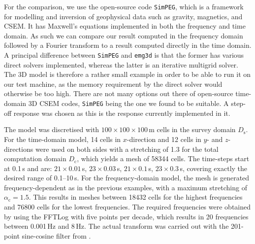 \documentclass[extra, camera,%
]{gji}
\newcommand{\mr}[1]{\mathrm{#1}}
\newcommand{\emg}[2]{\texttt{emg#1#2}\xspace}
\newcommand{\simpeg}{\texttt{SimPEG}\xspace}
\begin{document}
For the comparison, we use the open-source code \simpeg \citep{CAG.15.Cockett},
which is a framework for modelling and inversion of geophysical data such as
gravity, magnetics, and CSEM. It has Maxwell's equations implemented in both
the frequency and time domain. As such we can compare our result computed in
the frequency domain followed by a Fourier transform to a result computed
directly in the time domain. A principal difference between \simpeg and \emg3d
is that the former has various direct solvers implemented, whereas the latter
is an iterative multigrid solver. The 3D model is therefore a rather small
example in order to be able to run it on our test machine, as the memory
requirement by the direct solver would otherwise be too high. There are not
many options out there of open-source time-domain 3D CSEM codes, \simpeg being
the one we found to be suitable. A step-off response was chosen as this is the
response currently implemented in it.

The model was discretised with $100\times100\times100\,$m cells in the survey
domain $D_\mr{s}$. For the time-domain model, 14 cells in $x$-direction and 12
cells in $y$- and $z$-directions were used on both sides with a stretching of
1.3 for the total computation domain $D_\mr{c}$, which yields a mesh of
\num{58344} cells. The time-steps start at 0.1\,s and are: $21\times0.01\,$s,
$23\times0.03\,$s, $21\times0.1\,$s, $23\times0.3\,$s, covering exactly the
desired range of 0.1--10\,s. For the frequency-domain model, the mesh is
generated frequency-dependent as in the previous examples, with a maximum
stretching of $\alpha_\mr{c}=1.5$. This results in meshes between \num{18432}
cells for the highest frequencies and \num{76800} cells for the lowest
frequencies. The required frequencies were obtained by using the FFTLog with
five points per decade, which results in 20 frequencies between 0.001\,Hz and
8\,Hz. The actual transform was carried out with the 201-point sine-cosine
filter from \cite{GEO.09.Key}.
\end{document}
